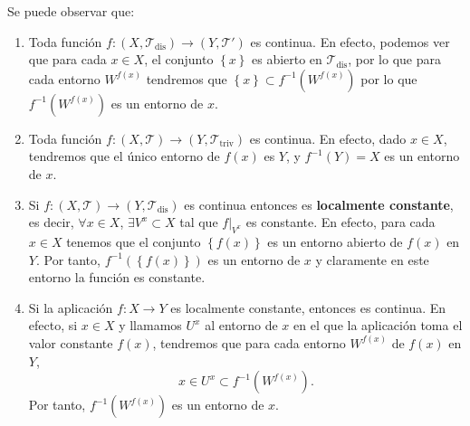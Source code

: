 \begin{eg}
Se puede observar que:
\begin{enumerate}
	\item Toda función $\displaystyle f : \left(X, \mathcal{T}_{\text{dis}}\right) \to \left(Y, \mathcal{T}'\right) $ es continua. En efecto, podemos ver que para cada $\displaystyle x \in X $, el conjunto $\displaystyle \left\{ x\right\}  $ es abierto en $\displaystyle \mathcal{T}_{\text{dis}} $, por lo que para cada entorno $\displaystyle W^{f\left(x\right)} $ tendremos que $\displaystyle \left\{ x\right\} \subset f^{-1}\left(W^{f\left(x\right)}\right) $ por lo que $\displaystyle f^{-1}\left(W^{f\left(x\right)}\right) $ es un entorno de $\displaystyle x $. 
	\item Toda función $\displaystyle f : \left(X, \mathcal{T}\right)\to \left(Y, \mathcal{T}_{\text{triv}}\right) $ es continua. En efecto, dado $\displaystyle x \in X $, tendremos que el único entorno de $\displaystyle f\left(x\right) $ es $\displaystyle Y $, y $\displaystyle f^{-1}\left(Y\right)=X $ es un entorno de $\displaystyle x $.
	\item Si $\displaystyle f : \left(X, \mathcal{T}\right)\to \left(Y, \mathcal{T}_{\text{dis}}\right) $ es continua entonces es \textbf{localmente constante}, es decir, $\displaystyle \forall x \in X $, $\displaystyle \exists V^{x}\subset X $ tal que $\displaystyle f|_{V^{x}} $ es constante. En efecto, para cada $\displaystyle x \in X $ tenemos que el conjunto $\displaystyle \left\{ f\left(x\right)\right\}  $ es un entorno abierto de $\displaystyle f\left(x\right) $ en $\displaystyle Y $. Por tanto, $\displaystyle f^{-1}\left( \left\{ f\left(x\right)\right\} \right) $ es un entorno de $\displaystyle x $ y claramente en este entorno la función es constante. 
	\item Si la aplicación $\displaystyle f : X \to Y $ es localmente constante, entonces es continua. En efecto, si $\displaystyle x \in X $ y llamamos $\displaystyle U^{x} $ al entorno de $\displaystyle x $ en el que la aplicación toma el valor constante $\displaystyle f\left(x\right) $, tendremos que para cada entorno $\displaystyle W^{f\left(x\right)} $ de $\displaystyle f\left(x\right) $ en $\displaystyle Y $, 
		\[x \in U^{x} \subset f^{-1}\left(W^{f\left(x\right)}\right) .\]
		Por tanto, $\displaystyle f^{-1}\left(W^{f\left(x\right)}\right) $ es un entorno de $\displaystyle x $. 
\end{enumerate}
\end{eg}

